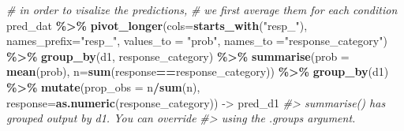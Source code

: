 \documentclass[
]{book}
\newenvironment{Shaded}{\begin{snugshade}}{\end{snugshade}}
\newcommand{\AttributeTok}[1]{\textcolor[rgb]{0.13,0.29,0.53}{#1}}
\newcommand{\CommentTok}[1]{\textcolor[rgb]{0.56,0.35,0.01}{\textit{#1}}}
\newcommand{\FunctionTok}[1]{\textcolor[rgb]{0.13,0.29,0.53}{\textbf{#1}}}
\newcommand{\NormalTok}[1]{#1}
\newcommand{\OtherTok}[1]{\textcolor[rgb]{0.56,0.35,0.01}{#1}}
\newcommand{\SpecialCharTok}[1]{\textcolor[rgb]{0.81,0.36,0.00}{\textbf{#1}}}
\newcommand{\StringTok}[1]{\textcolor[rgb]{0.31,0.60,0.02}{#1}}
\begin{document}
\begin{Shaded}
\begin{Highlighting}[]
\CommentTok{\# in order to visalize the predictions, }
\CommentTok{\# we first average them for each condition}
\NormalTok{pred\_dat }\SpecialCharTok{\%\textgreater{}\%}
  \FunctionTok{pivot\_longer}\NormalTok{(}\AttributeTok{cols=}\FunctionTok{starts\_with}\NormalTok{(}\StringTok{"resp\_"}\NormalTok{), }
               \AttributeTok{names\_prefix=}\StringTok{"resp\_"}\NormalTok{,}
               \AttributeTok{values\_to =} \StringTok{"prob"}\NormalTok{,}
               \AttributeTok{names\_to =}\StringTok{"response\_category"}\NormalTok{) }\SpecialCharTok{\%\textgreater{}\%}
  \FunctionTok{group\_by}\NormalTok{(d1, response\_category) }\SpecialCharTok{\%\textgreater{}\%}
  \FunctionTok{summarise}\NormalTok{(}\AttributeTok{prob =} \FunctionTok{mean}\NormalTok{(prob),}
            \AttributeTok{n=}\FunctionTok{sum}\NormalTok{(response}\SpecialCharTok{==}\NormalTok{response\_category)) }\SpecialCharTok{\%\textgreater{}\%}
  \FunctionTok{group\_by}\NormalTok{(d1) }\SpecialCharTok{\%\textgreater{}\%}
  \FunctionTok{mutate}\NormalTok{(}\AttributeTok{prop\_obs =}\NormalTok{ n}\SpecialCharTok{/}\FunctionTok{sum}\NormalTok{(n),}
    \AttributeTok{response=}\FunctionTok{as.numeric}\NormalTok{(response\_category)) }\OtherTok{{-}\textgreater{}}\NormalTok{ pred\_d1}
\CommentTok{\#\textgreater{} \textasciigrave{}summarise()\textasciigrave{} has grouped output by \textquotesingle{}d1\textquotesingle{}. You can override}
\CommentTok{\#\textgreater{} using the \textasciigrave{}.groups\textasciigrave{} argument.}
\end{Highlighting}
\end{Shaded}
\end{document}

